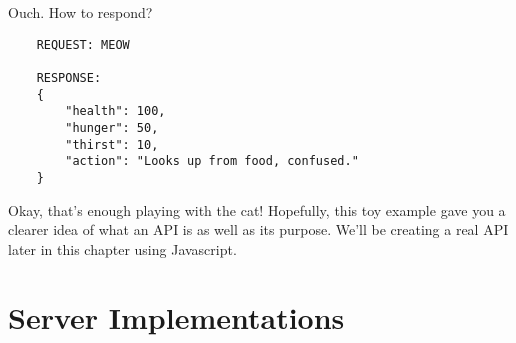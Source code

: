 \begin{kaobox}[title=Let's take a look at an example of a simple API.]
    Ouch. How to respond?

    \begin{verbatim}
    REQUEST: MEOW

    RESPONSE: 
    {
        "health": 100,
        "hunger": 50,
        "thirst": 10,
        "action": "Looks up from food, confused."
    }
    \end{verbatim}

    Okay, that's enough playing with the cat! Hopefully, this toy example gave you a clearer idea of what an API is as well as its purpose. We'll be creating a real API later in this chapter using Javascript.

\end{kaobox}

\section{Server Implementations}
